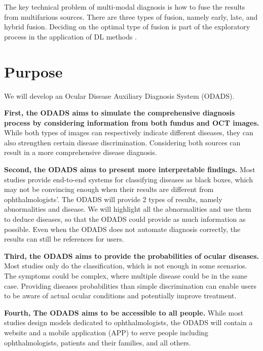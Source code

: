 \documentclass{article}
\begin{document}
		The key technical problem of multi-modal diagnosis is how to fuse the results from multifarious sources.  There are three types of fusion, namely early, late, and hybrid fusion.  Deciding on the optimal type of fusion is part of the exploratory process in the application of DL methods \autocite{Ichhpujani_Thakur_2021}.
		
		
	\section{Purpose}
		
		We will develop an Ocular Disease Auxiliary Diagnosis System (ODADS). 
		
		\vspace{0.3cm}
		
		\textbf{First, the ODADS aims to simulate the comprehensive diagnosis process by considering information from both fundus and OCT images.} While both types of images can respectively indicate different diseases, they can also strengthen certain disease discrimination.  Considering both sources can result in a more comprehensive disease diagnosis.
		
		\vspace{0.1cm}
		
		\textbf{Second, the ODADS aims to present more interpretable findings.}  Most studies provide end-to-end systems for classifying diseases as black boxes, which may not be convincing enough when their results are different from ophthalmologists'.  The ODADS will provide 2 types of results, namely abnormalities and disease.  We will highlight all the abnormalities and use them to deduce diseases, so that the ODADS could provide as much information as possible.  Even when the ODADS does not automate diagnosis correctly, the results can still be references for users.
		
		\vspace{0.1cm}
		
		\textbf{Third, the ODADS aims to provide the probabilities of ocular diseases.}  Most studies only do the classification, which is not enough in some scenarios.  The symptoms could be complex, where multiple disease could be in the same case.  Providing diseases probabilities than simple discrimination can enable users to be aware of actual ocular conditions and potentially improve treatment.
		
		\vspace{0.1cm}
		
		\textbf{Fourth, The ODADS aims to be accessible to all people.}  While most studies design models dedicated to ophthalmologists, the ODADS will contain a website and a mobile application (APP) to serve people including ophthalmologists, patients and their families, and all others.
\end{document}

